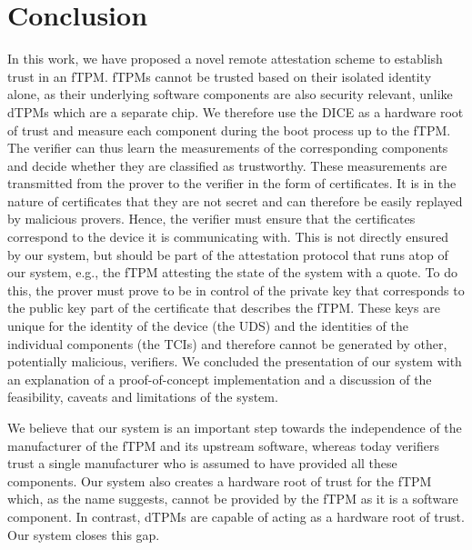 

\section{Conclusion}

In this work, we have proposed a novel remote attestation scheme to establish trust in an \ac{fTPM}\@.
\Acp{fTPM} cannot be trusted based on their isolated identity alone, as their underlying software components are also security relevant, unlike \acp{dTPM} which are a separate chip.
We therefore use the \ac{DICE} as a hardware root of trust and measure each component during the boot process up to the \ac{fTPM}\@.
The verifier can thus learn the measurements of the corresponding components and decide whether they are classified as trustworthy.
These measurements are transmitted from the prover to the verifier in the form of certificates.
It is in the nature of certificates that they are not secret and can therefore be easily replayed by malicious provers.
Hence, the verifier must ensure that the certificates correspond to the device it is communicating with.
This is not directly ensured by our system, but should be part of the attestation protocol that runs atop of our system, e.g., the \ac{fTPM} attesting the state of the system with a quote.
To do this, the prover must prove to be in control of the private key that corresponds to the public key part of the certificate that describes the \ac{fTPM}\@.
These keys are unique for the identity of the device (the \ac{UDS}) and the identities of the individual components (the \acp{TCI}) and therefore cannot be generated by other, potentially malicious, verifiers.
We concluded the presentation of our system with an explanation of a proof-of-concept implementation and a discussion of the feasibility, caveats and limitations of the system.

We believe that our system is an important step towards the independence of the manufacturer of the \ac{fTPM} and its upstream software, whereas today verifiers trust a single manufacturer who is assumed to have provided all these components.
Our system also creates a hardware root of trust for the \ac{fTPM} which, as the name suggests, cannot be provided by the \ac{fTPM} as it is a software component.
In contrast, \acp{dTPM} are capable of acting as a hardware root of trust.
Our system closes this gap.
